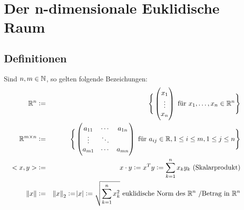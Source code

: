 \section{Der n-dimensionale Euklidische Raum}

\subsection{Definitionen}
Sind $n, m \in \mathbb{N}$, so gelten folgende Bezeichungen:
\begin{eqnarray*}
    \mathbb{R}^n &:=& \Bigg\{
        \begin{pmatrix}
            x_1\\
            \vdots \\
            x_n
        \end{pmatrix}
        \text{ für }
        x_1, \ldots, x_n \in \mathbb{R}^n
    \Bigg\} \\
    \mathbb{R}^{m \times n} &:=& \Bigg\{
        \begin{pmatrix}
            a_{11} & \cdots & a_{1n}\\
            \vdots & \ddots \\
            a_{m1} & \cdots & a_{mn}
        \end{pmatrix}
        \text{ für }
        a_{ij} \in \mathbb{R}, 1 \leq i \leq m, 1 \leq j \leq n
    \Bigg\}\\
    <x, y> &:=& x \cdot y := x^T y := \sum_{k=1}^n x_k y_k \text{ (Skalarprodukt)}\\
    \norm{x} &:=& {\Vert x \Vert}_2 := \abs{x} := \sqrt{\sum_{k=1}^n x_k^2}
    \text{ euklidische Norm des }\mathbb{R}^n\text{ /Betrag in }\mathbb{R}^n
\end{eqnarray*}

